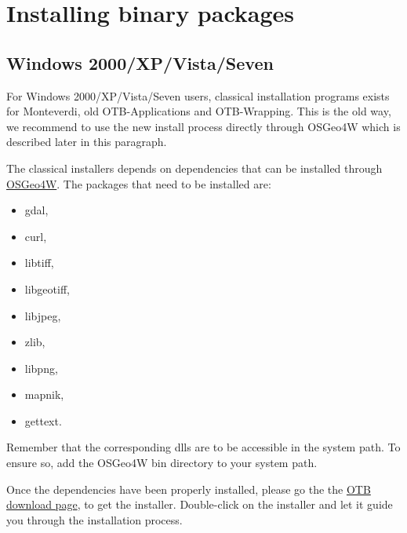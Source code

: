 \section{Installing binary packages}
\label{sec:install_binaries}

\subsection{Windows 2000/XP/Vista/Seven}
\label{ssec:windows_binaries}

For Windows 2000/XP/Vista/Seven users, classical installation programs exists for Monteverdi, 
old OTB-Applications and OTB-Wrapping. This is the old way, we recommend to use the new install
process directly through OSGeo4W which is described later in this paragraph. 

The classical installers depends on dependencies that can be installed through \href{http://trac.osgeo.org/osgeo4w/}{OSGeo4W}. The packages that
need to be installed are:
\begin{itemize}
\item gdal,
\item curl, 
\item libtiff,
\item libgeotiff,
\item libjpeg,
\item zlib, 
\item libpng,
\item mapnik,
\item gettext.
\end{itemize}\label{OSGeo4W_lib}
Remember that the corresponding dlls are to be accessible in the system path. To ensure so, add
the OSGeo4W bin directory to your system path.

Once the dependencies have been properly installed, please go the the 
\href{http://sourceforge.net/projects/orfeo-toolbox/}{OTB download page}, to
get the installer. Double-click on the installer and let it guide you through the 
installation process.

